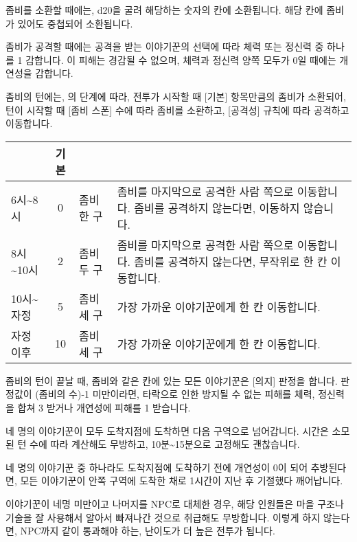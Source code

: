 \documentclass{report}
\begin{document}
		좀비를 소환할 때에는, d20을 굴려 해당하는 숫자의 칸에 소환됩니다. 해당 칸에 좀비가 있어도 중첩되어 소환됩니다.
		
		좀비가 공격할 때에는 공격을 받는 이야기꾼의 선택에 따라 체력 또는 정신력 중 하나를 1 감합니다. 이 피해는 경감될 수 없으며, 체력과 정신력 양쪽 모두가 0일 때에는 개연성을 감합니다.
		
		좀비의 턴에는, 의 단계에 따라, 전투가 시작할 때 [기본] 항목만큼의 좀비가 소환되어, 턴이 시작할 때 [좀비 스폰] 수에 따라 좀비를 소환하고, [공격성] 규칙에 따라 공격하고 이동합니다.
		
		\begin{tabularx}{\linewidth}{l|c|l|X}
			\makecell{\centering\textbf{시간}} & \textbf{기본} & \makecell{\centering\textbf{좀비 스폰}} & \makecell{\centering\textbf{공격성}}\\\hline\hline
			6시\textasciitilde8시 & 0 & 좀비 한 구 & 좀비를 마지막으로 공격한 사람 쪽으로 이동합니다. 좀비를 공격하지 않는다면, 이동하지 않습니다. \\\hline
			8시\textasciitilde10시 & 2 & 좀비 두 구 & 좀비를 마지막으로 공격한 사람 쪽으로 이동합니다. 좀비를 공격하지 않는다면, 무작위로 한 칸 이동합니다. \\\hline
			10시\textasciitilde 자정 & 5 & 좀비 세 구 & 가장 가까운 이야기꾼에게 한 칸 이동합니다. \\\hline
			자정 이후 & 10 & 좀비 세 구 & 가장 가까운 이야기꾼에게 한 칸 이동합니다.
		\end{tabularx}
		
		좀비의 턴이 끝날 때, 좀비와 같은 칸에 있는 모든 이야기꾼은 [의지] 판정을 합니다. 판정값이 (좀비의 수)-1 미만이라면, 타락으로 인한 방지될 수 없는 피해를 체력, 정신력을 합쳐 3 받거나 개연성에 피해를 1 받습니다.
		
		네 명의 이야기꾼이 모두 도착지점에 도착하면 다음 구역으로 넘어갑니다. 시간은 소모된 턴 수에 따라 계산해도 무방하고, 10분\textasciitilde15분으로 고정해도 괜찮습니다.
		
		네 명의 이야기꾼 중 하나라도 도착지점에 도착하기 전에 개연성이 0이 되어 추방된다면, 모든 이야기꾼이 안쪽 구역에 도착한 채로 1시간이 지난 후 기절했다 깨어납니다.
		
		이야기꾼이 네명 미만이고 나머지를 NPC로 대체한 경우, 해당 인원들은 마을 구조나 기술을 잘 사용해서 알아서 빠져나간 것으로 취급해도 무방합니다. 이렇게 하지 않는다면, NPC까지 같이 통과해야 하는, 난이도가 더 높은 전투가 됩니다.
	
\end{document}
